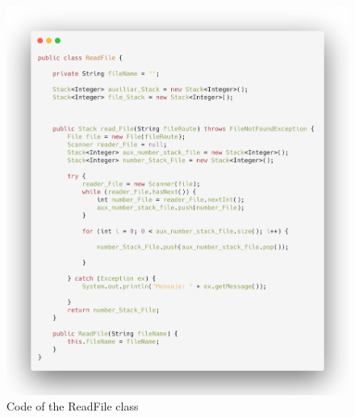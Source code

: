 \documentclass[a4paper]{article}
\theoremstyle{plain}
\theoremstyle{definition}
\begin{document}
             \begin{figure}[h]
                \centering
                \includegraphics[width=300pt\textwidth]{read-file.png}
                \caption{Code of the ReadFile class}
                \label{fig:mesh1}
            \end{figure}
        

\newpage
\end{document}
